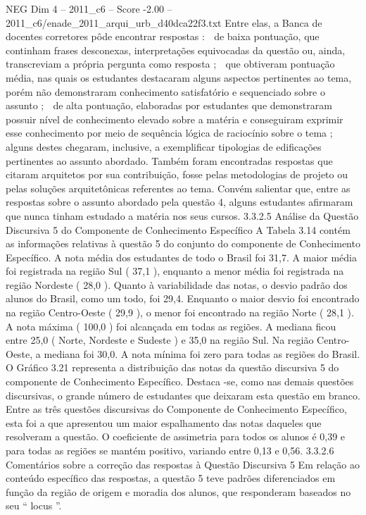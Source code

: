 \begin{textsample}{NEG Dim 4 – 2011\_c6 – Score -2.00 – 2011\_c6/enade\_2011\_arqui\_urb\_d40dca22f3.txt}
Entre elas, a Banca de docentes corretores pôde encontrar respostas :  de baixa pontuação, que continham frases desconexas, interpretações equivocadas da questão ou, ainda, transcreviam a própria pergunta como resposta ;  que obtiveram pontuação média, nas quais os estudantes destacaram alguns aspectos pertinentes ao tema, porém não demonstraram conhecimento satisfatório e sequenciado sobre o assunto ;  de alta pontuação, elaboradas por estudantes que demonstraram possuir nível de conhecimento elevado sobre a matéria e conseguiram exprimir esse conhecimento por meio de sequência lógica de raciocínio sobre o tema ; alguns destes chegaram, inclusive, a exemplificar tipologias de edificações pertinentes ao assunto abordado.
Também foram encontradas respostas que citaram arquitetos por sua contribuição, fosse pelas metodologias de projeto ou pelas soluções arquitetônicas referentes ao tema.
Convém salientar que, entre as respostas sobre o assunto abordado pela questão 4, alguns estudantes afirmaram que nunca tinham estudado a matéria nos seus cursos. 3.3.2.5 Análise da Questão Discursiva 5 do Componente de Conhecimento Específico A Tabela 3.14 contém as informações relativas à questão 5 do conjunto do componente de Conhecimento Específico.
A nota média dos estudantes de todo o Brasil foi 31,7.
A maior média foi registrada na região Sul ( 37,1 ), enquanto a menor média foi registrada na região Nordeste ( 28,0 ).
Quanto à variabilidade das notas, o desvio padrão dos alunos do Brasil, como um todo, foi 29,4.
Enquanto o maior desvio foi encontrado na região Centro-Oeste ( 29,9 ), o menor foi encontrado na região Norte ( 28,1 ).
A nota máxima ( 100,0 ) foi alcançada em todas as regiões.
A mediana ficou entre 25,0 ( Norte, Nordeste e Sudeste ) e 35,0 na região Sul.
Na região Centro-Oeste, a mediana foi 30,0.
A nota mínima foi zero para todas as regiões do Brasil.
O Gráfico 3.21 representa a distribuição das notas da questão discursiva 5 do componente de Conhecimento Específico.
Destaca -se, como nas demais questões discursivas, o grande número de estudantes que deixaram esta questão em branco.
Entre as três questões discursivas do Componente de Conhecimento Específico, esta foi a que apresentou um maior espalhamento das notas daqueles que resolveram a questão.
O coeficiente de assimetria para todos os alunos é 0,39 e para todas as regiões se mantém positivo, variando entre 0,13 e 0,56. 3.3.2.6 Comentários sobre a correção das respostas à Questão Discursiva 5 Em relação ao conteúdo específico das respostas, a questão 5 teve padrões diferenciados em função da região de origem e moradia dos alunos, que responderam baseados no seu “ locus ”.

\end{textsample}
